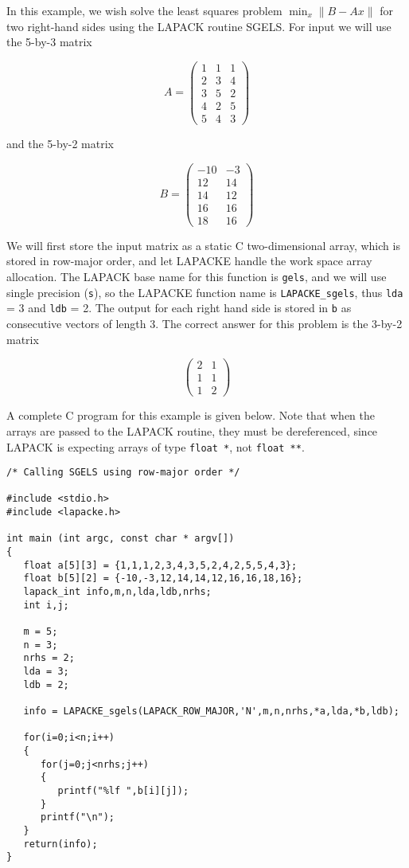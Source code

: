 In this example, we wish solve the least squares problem $\min_{x} \| B - Ax \|$ for two 
right-hand sides using the LAPACK routine SGELS. For input we will use the 5-by-3 matrix

\[
A = \left({\begin{array}{rrr} 
1 & 1 & 1 \\ 2 & 3 & 4 \\ 3 & 5 & 2 \\ 4 & 2 & 5 \\ 5 & 4 & 3
\end{array} } \right)
\]

and the 5-by-2 matrix

\[
B = \left({\begin{array}{rr} 
 -10 & -3 \\ 12 & 14 \\ 14 & 12 \\ 16 & 16 \\ 18 & 16
\end{array} } \right)
\]

We will first store the input matrix as a static C two-dimensional array, which is stored in row-major order, and let LAPACKE handle the work space array allocation. The LAPACK base name for this function is {\tt gels}, and we will use single precision ({\tt s}), so the LAPACKE function name is {\tt LAPACKE\_sgels}, 
thus {\tt lda} = 3 and {\tt ldb} = 2. The output for each right hand side is stored in {\tt b} as consecutive vectors of length 3. The correct answer for this problem is the 3-by-2 matrix

\[
\left({\begin{array}{rr}  
2 & 1 \\ 1 & 1 \\ 1 & 2
\end{array} } \right)
\]

A complete C program for this example is given below. Note that when the arrays are passed to the LAPACK routine, they must be dereferenced, since LAPACK is expecting arrays of type 
{\tt float~*}, not {\tt float~**}.

\begin{verbatim}
/* Calling SGELS using row-major order */

#include <stdio.h>
#include <lapacke.h>

int main (int argc, const char * argv[])
{
   float a[5][3] = {1,1,1,2,3,4,3,5,2,4,2,5,5,4,3};
   float b[5][2] = {-10,-3,12,14,14,12,16,16,18,16};
   lapack_int info,m,n,lda,ldb,nrhs;
   int i,j;

   m = 5;
   n = 3;
   nrhs = 2;
   lda = 3;
   ldb = 2;

   info = LAPACKE_sgels(LAPACK_ROW_MAJOR,'N',m,n,nrhs,*a,lda,*b,ldb);

   for(i=0;i<n;i++)
   {
      for(j=0;j<nrhs;j++)
      {
         printf("%lf ",b[i][j]);
      }
      printf("\n");
   }
   return(info);
}
\end{verbatim}

